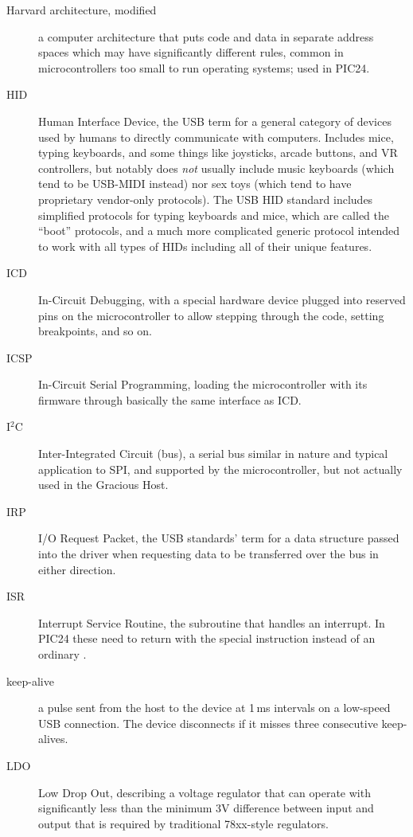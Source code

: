 \begin{description}
\item[Harvard architecture, modified] a computer architecture that puts code
and data in separate address spaces which may have significantly different
rules, common in microcontrollers too small to run operating systems; used
in PIC24.

\item[HID] Human Interface Device, the USB term for a general category of
devices used by humans to directly communicate with computers.  Includes
mice, typing keyboards, and some things like joysticks, arcade buttons, and
VR controllers, but notably does \emph{not} usually include music keyboards
(which tend to be USB-MIDI instead) nor sex toys (which tend to have
proprietary vendor-only protocols).  The USB HID standard includes
simplified protocols for typing keyboards and mice, which are called the
``boot'' protocols, and a much more complicated generic protocol intended to
work with all types of HIDs including all of their unique features.

\item[ICD] In-Circuit Debugging, with a special hardware device plugged into
reserved pins on the microcontroller to allow stepping through the code,
setting breakpoints, and so on.

\item[ICSP] In-Circuit Serial Programming, loading the microcontroller with
its firmware through basically the same interface as ICD.

\item[I$^2$C] Inter-Integrated Circuit (bus), a serial bus similar in nature
and typical application to SPI, and supported by the microcontroller, but
not actually used in the Gracious Host.

\item[IRP] I/O Request Packet, the USB standards' term for a data structure
passed into the driver when requesting data to be transferred over the bus
in either direction.

\item[ISR] Interrupt Service Routine, the subroutine that handles an
interrupt.  In PIC24 these need to return with the special 
instruction instead of an ordinary .

\item[keep-alive] a pulse sent from the host to the device at 1\,ms
intervals on a low-speed USB connection.  The device disconnects if it
misses three consecutive keep-alives.

\item[LDO] Low Drop Out, describing a voltage regulator that can operate
with significantly less than the minimum 3V difference between input and
output that is required by traditional 78xx-style regulators.


\end{description}
